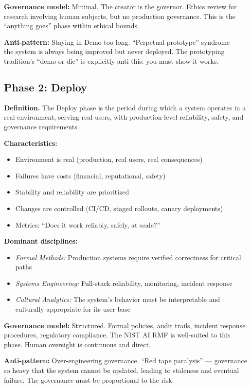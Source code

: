 \documentclass[11pt,a4paper]{article}
\begin{document}
\textbf{Governance model:} Minimal. The creator is the governor. Ethics review for research involving human subjects, but no production governance. This is the ``anything goes'' phase within ethical bounds.

\textbf{Anti-pattern:} Staying in Demo too long. ``Perpetual prototype'' syndrome --- the system is always being improved but never deployed. The prototyping tradition's ``demo or die'' is explicitly anti-this: you must show it works.

\subsection{Phase 2: Deploy}

\textbf{Definition.} The Deploy phase is the period during which a system operates in a real environment, serving real users, with production-level reliability, safety, and governance requirements.

\textbf{Characteristics:}
\begin{itemize}[nosep]
    \item Environment is real (production, real users, real consequences)
    \item Failures have costs (financial, reputational, safety)
    \item Stability and reliability are prioritized
    \item Changes are controlled (CI/CD, staged rollouts, canary deployments)
    \item Metrics: ``Does it work reliably, safely, at scale?''
\end{itemize}

\textbf{Dominant disciplines:}
\begin{itemize}[nosep]
    \item \emph{Formal Methods:} Production systems require verified correctness for critical paths
    \item \emph{Systems Engineering:} Full-stack reliability, monitoring, incident response
    \item \emph{Cultural Analytics:} The system's behavior must be interpretable and culturally appropriate for its user base
\end{itemize}

\textbf{Governance model:} Structured. Formal policies, audit trails, incident response procedures, regulatory compliance. The NIST AI RMF is well-suited to this phase. Human oversight is continuous and direct.

\textbf{Anti-pattern:} Over-engineering governance. ``Red tape paralysis'' --- governance so heavy that the system cannot be updated, leading to staleness and eventual failure. The governance must be proportional to the risk.
\end{document}
